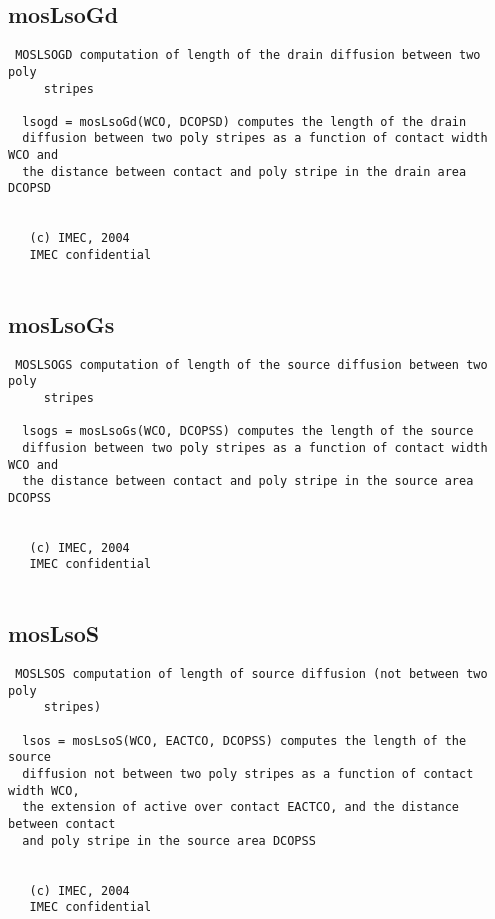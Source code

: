 \newpage
\subsection{mosLsoGd}
\label{sec:mosLsoGd}
\begin{verbatim}
 MOSLSOGD computation of length of the drain diffusion between two poly
     stripes
 
  lsogd = mosLsoGd(WCO, DCOPSD) computes the length of the drain
  diffusion between two poly stripes as a function of contact width WCO and
  the distance between contact and poly stripe in the drain area DCOPSD
 
 
   (c) IMEC, 2004
   IMEC confidential 
 

\end{verbatim}

\newpage
\subsection{mosLsoGs}
\label{sec:mosLsoGs}
\begin{verbatim}
 MOSLSOGS computation of length of the source diffusion between two poly
     stripes
 
  lsogs = mosLsoGs(WCO, DCOPSS) computes the length of the source
  diffusion between two poly stripes as a function of contact width WCO and
  the distance between contact and poly stripe in the source area DCOPSS
 
 
   (c) IMEC, 2004
   IMEC confidential 
 

\end{verbatim}

\newpage
\subsection{mosLsoS}
\label{sec:mosLsoS}
\begin{verbatim}
 MOSLSOS computation of length of source diffusion (not between two poly
     stripes)
 
  lsos = mosLsoS(WCO, EACTCO, DCOPSS) computes the length of the source
  diffusion not between two poly stripes as a function of contact width WCO,
  the extension of active over contact EACTCO, and the distance between contact
  and poly stripe in the source area DCOPSS
 
 
   (c) IMEC, 2004
   IMEC confidential 
 

\end{verbatim}


